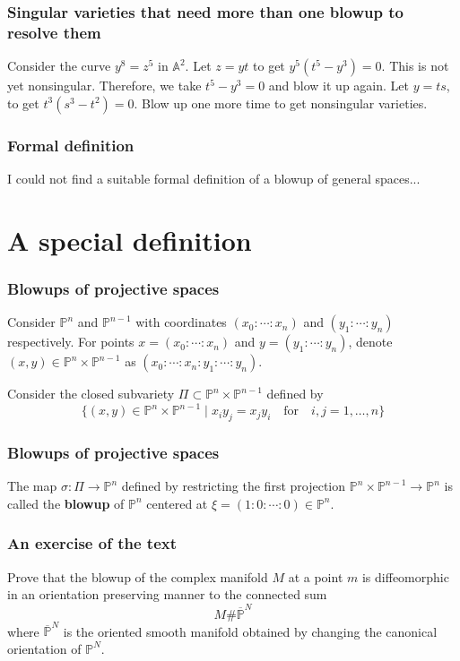 \documentclass{beamer}
\begin{document}
\begin{frame}
\frametitle{Singular varieties that need more than one blowup to resolve them}
\begin{example}
    Consider the curve $y^8 = z^5$ in $\mathbb{A}^2$. Let $z = yt$ to get $y^5(t^5-y^3)=0$. This is not yet nonsingular. Therefore, we take $t^5 - y^3 = 0$ and blow it up again. Let $y = ts$, to get $t^3(s^3-t^2) = 0$. Blow up one more time to get nonsingular varieties.
\end{example}
\end{frame}

\begin{frame}
\frametitle{Formal definition}
I could not find a suitable formal definition of a blowup of general spaces...
\end{frame}


\section{A special definition}

\begin{frame}
\frametitle{Blowups of projective spaces}

Consider $\mathbb{P}^n$ and $\mathbb{P}^{n-1}$ with coordinates $(x_0 : \cdots : x_n)$ and $(y_1: \cdots :y_n)$ respectively. For points $x = (x_0 : \cdots : x_n)$ and $y = (y_1 : \cdots : y_n)$, denote $(x,y) \in \mathbb{P}^n \times \mathbb{P}^{n-1}$ as $(x_0 : \cdots :x_n : y_1 : \cdots : y_n)$.\pause

Consider the closed subvariety $\Pi \subset \mathbb{P}^n\times \mathbb{P}^{n-1}$ defined by \[\{(x,y)\in\mathbb{P}^n\times\mathbb{P}^{n-1} \mid x_iy_j = x_jy_i \quad \text{for} \quad i,j = 1,\ldots,n\}\]

\end{frame}


\begin{frame}
\frametitle{Blowups of projective spaces}

\begin{definition}
    The map $\sigma: \Pi \to \mathbb{P}^n$ defined by restricting the first projection $\mathbb{P}^n\times \mathbb{P}^{n-1} \to \mathbb{P}^n$ is called the \textbf{blowup} of $\mathbb{P}^n$ centered at $\xi = (1:0:\cdots:0) \in \mathbb{P}^n$.
\end{definition}
\end{frame}


\begin{frame}
\frametitle{An exercise of the text}
\begin{problem}
    Prove that the blowup of the complex manifold $M$ at a point $m$ is diffeomorphic in an orientation preserving manner to the connected sum \[M\#\overline{\mathbb{P}}^N\] where $\overline{\mathbb{P}}^N$ is the oriented smooth manifold obtained by changing the canonical orientation of $\mathbb{P}^N$.
\end{problem}
\end{frame}
\end{document}

